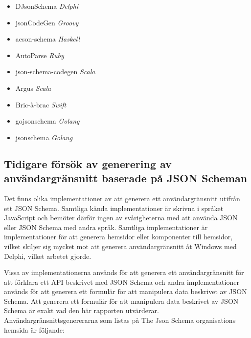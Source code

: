 \begin{itemize}
	\item DJsonSchema \textit{Delphi} \cite{Schlothauer&WauerGmbH}
	\item jsonCodeGen \textit{Groovy} \cite{Schlothauer&WauerGmbHa}
	\item aeson-schema \textit{Haskell} \cite{Kowalczyk}
	\item AutoParse \textit{Ruby} \cite{Googleb}
	\item json-schema-codegen \textit{Scala} \cite{Tundra}
	\item Argus \textit{Scala} \cite{Fenton}
	\item Bric-à-brac \textit{Swift} \cite{GlimpseI/OInc}
	\item gojsonschema \textit{Golang} \cite{Zhangtao}
	\item jsonschema \textit{Golang} \cite{Qriinc.}
\end{itemize}

\subsection{Tidigare försök av generering av användargränsnitt baserade på JSON Scheman}
\label{sec:teori:schema-användningsområden:ui-generering}
Det finns olika implementationer av att generera ett användargränsnitt utifrån ett JSON Schema. Samtliga kända implementationer är skrivna i språket JavaScript och bemöter därför ingen av svårigheterna med att använda JSON eller JSON Schema med andra språk. Samtliga implementationer är implementationer för att generera hemsidor eller komponenter till hemsidor, vilket skiljer sig mycket mot att generera användargränsnitt åt Windows med Delphi, vilket arbetet gjorde.

Vissa av implementationerna används för att generera ett användargränsnitt för att förklara ett API beskrivet med JSON Schema och andra implementationer används för att generera ett formulär för att manipulera data beskrivet av JSON Schema. Att generera ett formulär för att manipulera data beskrivet av JSON Schema är exakt vad den här rapporten utvärderar. Användargränsnittsgenererarna som listas på The Json Schema organisations hemsida är följande:

